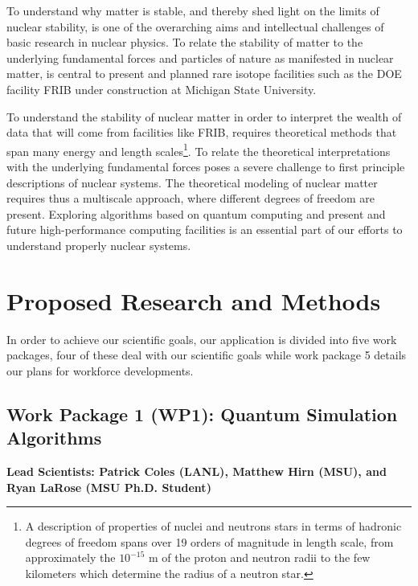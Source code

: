 \documentclass[10pt]{article}
\begin{document}
To understand why matter is stable, and thereby shed light on the
limits of nuclear stability, is one of the overarching aims and
intellectual challenges of basic research in nuclear physics. To
relate the stability of matter to the underlying fundamental forces
and particles of nature as manifested in nuclear matter, is central to
present and planned rare isotope facilities such as the DOE facility
FRIB under construction at Michigan State University.

To understand the stability of nuclear matter in order to interpret
the wealth of data that will come from facilities like FRIB, requires
theoretical methods that span many energy and length scales\footnote{A
  description of properties of nuclei and neutrons stars in terms of
  hadronic degrees of freedom spans over 19 orders of magnitude in
  length scale, from approximately the $10^{-15}$ m of the proton and
  neutron radii to the few kilometers which determine the radius of a
  neutron star.}. To relate the theoretical interpretations with the
underlying fundamental forces poses a severe challenge to first
principle descriptions of nuclear systems.  The theoretical modeling
of nuclear matter requires thus a multiscale approach, where different
degrees of freedom are present. Exploring algorithms based on quantum
computing and present and future high-performance computing facilities
is an essential part of our efforts to understand properly nuclear
systems.


\section{Proposed Research and Methods}

In order to achieve our scientific goals, our application is divided into five work packages, four of these deal with our scientific goals while work package 5 details our plans for workforce developments. 


\subsection{Work Package 1 (WP1): Quantum Simulation Algorithms}

{\bf Lead Scientists: Patrick Coles (LANL), Matthew Hirn (MSU), and Ryan LaRose (MSU Ph.D. Student)}
\end{document}
